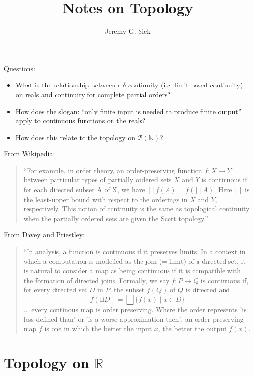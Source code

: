 \documentclass{article}
\title{Notes on Topology}
\author{Jeremy G. Siek}
\newcommand{\Reals}[0]{\mathbb{R}}
\begin{document}
\maketitle

Questions:
\begin{itemize}
\item What is the relationship between $\epsilon$-$\delta$ continuity
  (i.e. limit-based continuity) on reals and continuity for complete
  partial orders?
\item How does the slogan: ``only finite input is needed to produce
  finite output'' apply to continuous functions on the reals?
\item How does this relate to the topology on $\mathcal{P}(\mathbb{N})$?
\end{itemize}


From Wikipedia:
\begin{quote}
``For example, in order theory, an order-preserving function $f: X \to
  Y$ between particular types of partially ordered sets $X$ and $Y$ is
  continuous if for each directed subset A of X, we have $\bigsqcup
  f(A) = f(\bigsqcup A)$. Here $\bigsqcup$ is the least-upper bound
  with respect to the orderings in $X$ and $Y$, respectively. This
  notion of continuity is the same as topological continuity when the
  partially ordered sets are given the Scott topology.''
\end{quote}

From Davey and Priestley:
\begin{quote}
  ``In analysis, a function is continuous if it preserves limits.
  In a context in which a computation is modelled as the join (= limit)
  of a directed set, it is natural to consider a map as being continuous if it is compatible with
  the formation of directed joins. Formally, we say $f : P \to Q$ is continuous if,
  for every directed set $D$ in $P$, the subset $f(Q)$ of $Q$ is directed and
  \[
  f\left(\sqcup D\right) = \bigsqcup \{ f(x) \mid x \in D \}
  \]
  ... every continous map is order preserving. Where the order represents 'is less defined than'
  or 'is a worse approximation then', an order-preserving map $f$ is one in which the
  better the input $x$, the better the output $f(x)$.
\end{quote}

\section{Topology on $\Reals$}
\end{document}
